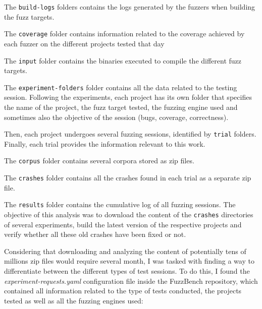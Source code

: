  
The \verb|build-logs| folders contains the logs generated by the fuzzers when building the fuzz targets.

 
The \verb|coverage| folder contains information related to the coverage achieved by each fuzzer on the different projects tested that day

The \verb|input| folder contains the binaries executed to compile the different fuzz targets.

The \verb|experiment-folders| folder contains all the data related to the testing session.
Following the experiments, each project has its own folder that specifies the name of the project, the fuzz target tested, the fuzzing engine used and sometimes also the objective of the session (bugs, coverage, correctness). 

Then, each project undergoes several fuzzing sessions, identified by \verb|trial| folders.
Finally, each trial provides the information relevant to this work.

The \verb|corpus| folder contains several corpora stored as zip files.

The \verb|crashes| folder contains all the crashes found in each trial as a separate zip file.

The \verb|results| folder contains the cumulative log of all fuzzing sessions.
The objective of this analysis was to download the content of the \verb|crashes| directories of several experiments, build the latest version of the respective projects and verify whether all these old crashes have been fixed or not.

Considering that downloading and analyzing the content of potentially tens of millions zip files would require several month, I was tasked with finding a way to differentiate between the different types of test sessions.
To do this, I found the \textit{experiment-requests.yaml} configuration file \cite{exp_yaml} inside the FuzzBench repository, which contained
all information related to the type of tests conducted, the projects tested as well as all the fuzzing engines used:

